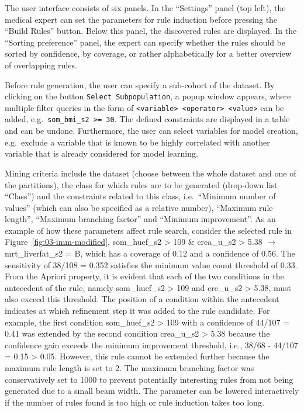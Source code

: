 \documentclass[
  oneside]{book}
\begin{document}
The user interface consists of six panels.
In the ``Settings'' panel (top left), the medical expert can set the parameters for rule induction before pressing the ``Build Rules'' button.
Below this panel, the discovered rules are displayed.
In the ``Sorting preference'' panel, the expert can specify whether the rules should be sorted by confidence, by coverage, or rather alphabetically for a better overview of overlapping rules.

Before rule generation, the user can specify a sub-cohort of the dataset.
By clicking on the button \texttt{Select\ Subpopulation}, a popup window appears, where multiple filter queries in the form of \texttt{\textless{}variable\textgreater{}\ \textless{}operator\textgreater{}\ \textless{}value\textgreater{}} can be added, e.g.~\texttt{som\_bmi\_s2\ \textgreater{}=\ 30}.
The defined constraints are displayed in a table and can be undone.
Furthermore, the user can select variables for model creation, e.g.~exclude a variable that is known to be highly correlated with another variable that is already considered for model learning.

Mining criteria include the dataset (choose between the whole dataset and one of the partitions), the class for which rules are to be generated (drop-down list ``Class'') and the constraints related to this class, i.e.~``Minimum number of values'' (which can also be specified as a relative number), ``Maximum rule length'', ``Maximum branching factor'' and ``Minimum improvement''.
As an example of how these parameters affect rule search, consider the selected rule in Figure~\ref{fig:03-imm-modified}, som\_huef\_s2 \textgreater{} 109 \& crea\_u\_s2 \textgreater{} 5.38 \(\longrightarrow\) mrt\_liverfat\_s2 = B, which has a coverage of 0.12 and a confidence of 0.56.
The sensitivity of 38/108 = 0.352 satisfies the minimum value count threshold of 0.33.
From the Apriori property, it is evident that each of the two conditions in the antecedent of the rule, namely som\_huef\_s2 \textgreater{} 109 and cre\_u\_s2 \textgreater{} 5.38, must also exceed this threshold.
The position of a condition within the antecedent indicates at which refinement step it was added to the rule candidate.
For example, the first condition som\_huef\_s2 \textgreater{} 109 with a confidence of 44/107 = 0.41 was extended by the second condition crea\_u\_s2 \textgreater{} 5.38 because the confidence gain exceeds the minimum improvement threshold, i.e., 38/68 - 44/107 = 0.15 \textgreater{} 0.05.
However, this rule cannot be extended further because the maximum rule length is set to 2.
The maximum branching factor was conservatively set to 1000 to prevent potentially interesting rules from not being generated due to a small beam width.
The parameter can be lowered interactively if the number of rules found is too high or rule induction takes too long.
\end{document}
